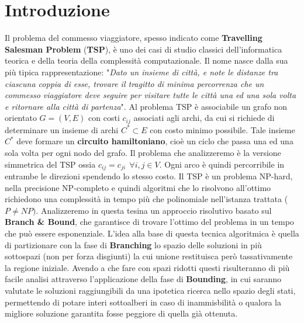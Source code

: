 \documentclass[
    article,            %
    12pt,                %
    oneside,            %
    a4paper,            %
    english,            %
    italian,                %
    sumario=tradicional,
]{abntex2}
\begin{document}
    \section{Introduzione}\label{sec:introduzione}
    Il problema del commesso viaggiatore, spesso indicato come \textbf{Travelling Salesman Problem} (\textbf{TSP}), è uno dei casi di studio classici dell'informatica teorica e della teoria della complessità computazionale.
    Il nome nasce dalla sua più tipica rappresentazione: "\textit{Dato un insieme di città, e note le distanze tra ciascuna coppia di esse, trovare il tragitto di minima percorrenza che un commesso viaggiatore deve seguire per visitare tutte le città una ed una sola volta e ritornare alla città di partenza}". Al problema TSP è associabile un grafo non orientato $G=(V,E)$ con costi $c_{ij}$ associati agli archi, da cui si richiede di determinare un insieme di archi $C^* \subset E$ con costo minimo possibile.
    Tale insieme $C^*$ deve formare un \textbf{circuito hamiltoniano}, cioè un ciclo che passa una ed una sola volta per ogni nodo del grafo.
    Il problema che analizzeremo è la versione simmetrica del TSP ossia $c_{ij} = c_{ji} \:\: \forall i,j \in V$.
    Ogni arco è quindi percorribile in entrambe le direzioni spendendo lo stesso costo.
    \newline
    Il TSP è un problema NP-hard, nella precisione NP-completo e quindi algoritmi che lo risolvono all'ottimo richiedono una complessità in tempo più che polinomiale nell'istanza trattata ($P \neq NP)$.
    \newline
    Analizzeremo in questa tesina un approccio risolutivo basato sul \textbf{Branch \& Bound}, che garantisce di trovare l'ottimo del problema in un tempo che può essere esponenziale.
    L'idea alla base di questa tecnica algoritmica è quella di partizionare con la fase di \textbf{Branching} lo spazio delle soluzioni in più sottospazi (non per forza disgiunti) la cui unione restituisca però tassativamente la regione iniziale.
    Avendo a che fare con spazi ridotti questi risulteranno di più facile analisi attraverso l'applicazione della fase di \textbf{Bounding}, in cui saranno valutate le soluzioni raggiungibili da una ipotetica ricerca nello spazio degli stati, permettendo di potare interi sottoalberi in caso di inammisbilità o qualora la migliore soluzione garantita fosse peggiore di quella già ottenuta.
\end{document}
